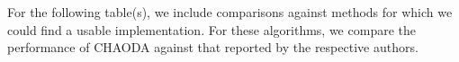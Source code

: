 

For the following table(s), we include comparisons against methods for which we could find a usable implementation.
For these algorithms, we compare the performance of CHAODA against that reported by the respective authors.

